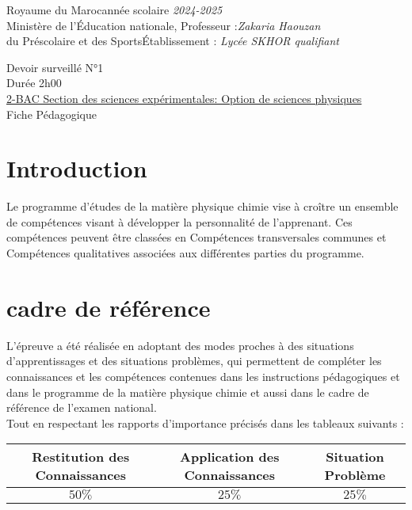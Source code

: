 \documentclass[12pt]{article}
\newcommand\headerMe[2]{\noindent{}#1\hfill#2}
\begin{document}
\headerMe{Royaume du Maroc}{année scolaire \emph{2024-2025}}\\
\headerMe{Ministère de l'Éducation nationale, }{  Professeur :\emph{Zakaria Haouzan}}\\
\headerMe{du Préscolaire et des Sports}{Établissement : \emph{Lycée SKHOR qualifiant}}\\

\begin{center}
Devoir surveillé N°1 \\
Durée 2h00\\
\underline{2-BAC Section des sciences expérimentales: Option de sciences physiques}\\

    \vspace{.2cm}
\hrulefill
\Large{Fiche Pédagogique}
\hrulefill\\
\end{center}


\section[A]{Introduction }
\hspace{0.5cm}Le programme d'études de la matière physique chimie vise à croître un ensemble de compétences visant à développer la personnalité de l'apprenant. Ces compétences peuvent être classées en Compétences transversales communes et Compétences qualitatives associées aux différentes parties du programme.
\section{cadre de référence }
 \hspace{0.5cm}L'épreuve a été réalisée en adoptant des modes proches à des situations d'apprentissages et des situations problèmes, qui permettent de compléter les connaissances et les compétences contenues dans les instructions pédagogiques et dans le programme de la matière physique chimie et aussi dans le cadre de référence de l'examen national. 
 \\Tout en respectant les rapports d'importance précisés dans les tableaux suivants :
 \begin{center}
\begin{tabular}{|c||c||c|}
\hline
    \textbf{Restitution des Connaissances} & \textbf{Application des Connaissances} & \textbf{Situation Problème }\\
    \hline 
    $50\%$ & $25\%$ & $25\%$\\
    \hline
\end{tabular} 
\end{center}
\end{document}
